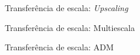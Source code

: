 \documentclass[professionalfont]{beamer}
\begin{document}



        

    

\begin{frame}{Transferência de escala: {\small \textit{Upscaling}}}
    \centering
    \resizebox*{7cm}{!}{
    }
    
\end{frame}

\begin{frame}{Transferência de escala: {\small {Multiescala}}}
    \centering
    \resizebox*{9cm}{!}{
        }
    
\end{frame}

\begin{frame}{Transferência de escala: {\small ADM}}
    \centering
    \resizebox*{9cm}{!}{
        }
    
\end{frame}

        
\end{document}
